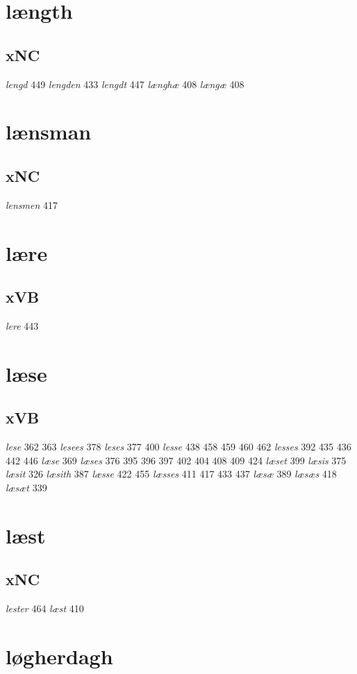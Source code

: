 \documentclass[a4paper,twocolumn]{article}
\begin{document}
\section{længth}
\label{sec:orgb941fe7}
\subsection{xNC}
\label{sec:org247cd4d}
\emph{lengd} 449 \emph{lengden} 433 \emph{lengdt} 447 \emph{længhæ} 408 \emph{længæ} 408 
\section{lænsman}
\label{sec:orgd5f6a5f}
\subsection{xNC}
\label{sec:org49b0ac5}
\emph{lensmen} 417 
\section{lære}
\label{sec:org5c9ac70}
\subsection{xVB}
\label{sec:org6a7dd7c}
\emph{lere} 443 
\section{læse}
\label{sec:org03f8ad7}
\subsection{xVB}
\label{sec:org4dfdc63}
\emph{lese} 362 363 \emph{lesees} 378 \emph{leses} 377 400 \emph{lesse} 438 458 459 460 462 \emph{lesses} 392 435 436 442 446 \emph{læse} 369 \emph{læses} 376 395 396 397 402 404 408 409 424 \emph{læset} 399 \emph{læsis} 375 \emph{læsit} 326 \emph{læsith} 387 \emph{læsse} 422 455 \emph{læsses} 411 417 433 437 \emph{læsæ} 389 \emph{læsæs} 418 \emph{læsæt} 339 
\section{læst}
\label{sec:org48ddb3b}
\subsection{xNC}
\label{sec:orgb0a7b79}
\emph{lester} 464 \emph{læst} 410 
\section{løgherdagh}
\label{sec:org6effb74}
\end{document}
